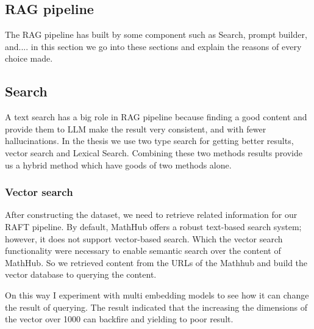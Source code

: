 

\subsection{RAG pipeline}

The RAG pipeline has built by some component such as Search, prompt builder, and....
in this section we go into these sections and explain the reasons of every choice made. 

\subsection{Search}
A text search has a big role in RAG pipeline because finding a good content and provide them to LLM make the result
very consistent, and with fewer hallucinations. 
In the thesis we use two type search for getting better results, vector search and Lexical Search. 
Combining these two methods results provide us a hybrid method which have goods of two methods alone.
\subsubsection{Vector search}
After constructing the dataset, we need to retrieve related information for our RAFT pipeline.
By default, MathHub offers a robust text-based search system; however, it does not support vector-based search.
Which the vector search functionality were necessary to enable semantic search over the content of MathHub.
So we retrieved content from the URLs of the Mathhub and build the vector database to querying
the content.

On this way I experiment with multi embedding models to see how it can change the result of querying.
The result indicated that the increasing the dimensions of the vector over 1000 can backfire
and yielding to poor result.

